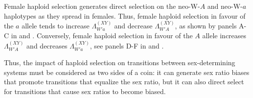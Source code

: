 \documentclass[10pt,letterpaper]{article}
\begin{document}
Female haploid selection generates direct selection on the neo-W-$A$ and neo-W-$a$ haplotypes as they spread in females. 
Thus, female haploid selection in favour of the $a$ allele tends to increase $\Lambda_{W'a}^{(XY)}$ and decrease $\Lambda_{W'A}^{(XY)}$, as shown by panels A-C in  and . 
Conversely, female haploid selection in favour of the $A$ allele increases $\Lambda_{W'A}^{(XY)}$ and decreases $\Lambda_{W'a}^{(XY)}$, see panels D-F in  and . 

Thus, the impact of haploid selection on transitions between sex-determining systems must be considered as two sides of a coin: it can generate sex ratio biases that promote transitions that equalize the sex ratio, but it can also direct select for transitions that cause sex ratios to become biased.


\end{document}
